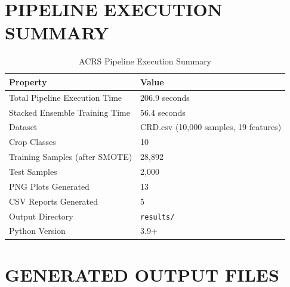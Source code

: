 \documentclass[12pt,a4paper,oneside]{report}
\begin{document}
\section{PIPELINE EXECUTION SUMMARY}

\begin{table}[H]
\centering
\caption{ACRS Pipeline Execution Summary}
\label{tab:execution}
\renewcommand{\arraystretch}{1.3}
\begin{tabular}{p{6cm} p{6cm}}
\toprule
\textbf{Property} & \textbf{Value} \\
\midrule
Total Pipeline Execution Time & 206.9 seconds \\
Stacked Ensemble Training Time & 56.4 seconds \\
Dataset & CRD.csv (10,000 samples, 19 features) \\
Crop Classes & 10 \\
Training Samples (after SMOTE) & 28,892 \\
Test Samples & 2,000 \\
PNG Plots Generated & 13 \\
CSV Reports Generated & 5 \\
Output Directory & \texttt{results/} \\
Python Version & 3.9+ \\
\bottomrule
\end{tabular}
\end{table}

\section{GENERATED OUTPUT FILES}
\end{document}
